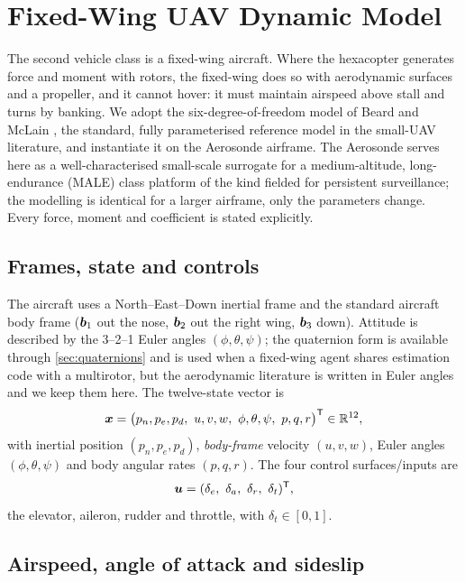\chapter{Fixed-Wing UAV Dynamic Model}
\label{ch:fixedwing}

The second vehicle class is a fixed-wing aircraft. Where the hexacopter generates
force and moment with rotors, the fixed-wing does so with aerodynamic surfaces
and a propeller, and it cannot hover: it must maintain airspeed above stall and
turns by banking. We adopt the six-degree-of-freedom model of Beard and McLain
\cite{beard2012small}, the standard, fully parameterised reference model in the
small-UAV literature, and instantiate it on the Aerosonde airframe. The Aerosonde
serves here as a well-characterised small-scale surrogate for a
medium-altitude, long-endurance (MALE) class platform of the kind fielded for
persistent surveillance; the modelling is identical for a larger airframe, only
the parameters change. Every force, moment and coefficient is stated explicitly.

\section{Frames, state and controls}

The aircraft uses a North--East--Down inertial frame and the standard aircraft
body frame ($\bm{b}_1$ out the nose, $\bm{b}_2$ out the right wing, $\bm{b}_3$
down). Attitude is described by the 3--2--1 Euler angles $(\phi,\theta,\psi)$;
the quaternion form is available through \cref{sec:quaternions} and is used when
a fixed-wing agent shares estimation code with a multirotor, but the aerodynamic
literature is written in Euler angles and we keep them here. The twelve-state
vector is
\begin{equation}
\state=\bigl(p_n,p_e,p_d,\ u,v,w,\ \phi,\theta,\psi,\ p,q,r\bigr)\T\in\R^{12},
\label{eq:fw-state}
\end{equation}
with inertial position $(p_n,p_e,p_d)$, \emph{body-frame} velocity $(u,v,w)$,
Euler angles $(\phi,\theta,\psi)$ and body angular rates $(p,q,r)$. The four
control surfaces/inputs are
\begin{equation}
\ctrl=(\delta_e,\ \delta_a,\ \delta_r,\ \delta_t)\T,
\label{eq:fw-input}
\end{equation}
the elevator, aileron, rudder and throttle, with
$\delta_t\in[0,1]$.

\section{Airspeed, angle of attack and sideslip}
\label{sec:fw-airdata}

